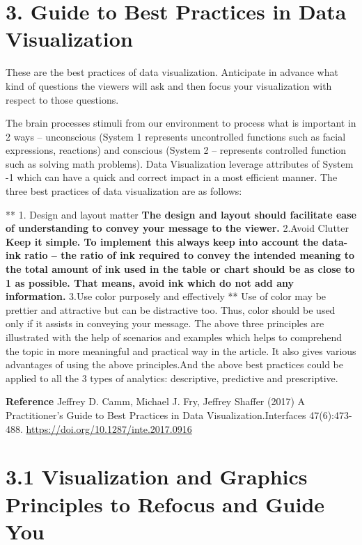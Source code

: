 \documentclass[]{book}
\theoremstyle{definition}
\theoremstyle{definition}
\theoremstyle{definition}
\theoremstyle{remark}
\begin{document}
\section{3. Guide to Best Practices in Data
Visualization}\label{guide-to-best-practices-in-data-visualization}

These are the best practices of data visualization. Anticipate in
advance what kind of questions the viewers will ask and then focus your
visualization with respect to those questions.

The brain processes stimuli from our environment to process what is
important in 2 ways -- unconscious (System 1 represents uncontrolled
functions such as facial expressions, reactions) and conscious (System 2
-- represents controlled function such as solving math problems). Data
Visualization leverage attributes of System -1 which can have a quick
and correct impact in a most efficient manner. The three best practices
of data visualization are as follows:

** 1. Design and layout matter \textbf{ The design and layout should
facilitate ease of understanding to convey your message to the viewer. }
2.Avoid Clutter \textbf{ Keep it simple. To implement this always keep
into account the data-ink ratio -- the ratio of ink required to convey
the intended meaning to the total amount of ink used in the table or
chart should be as close to 1 as possible. That means, avoid ink which
do not add any information. } 3.Use color purposely and effectively **
Use of color may be prettier and attractive but can be distractive too.
Thus, color should be used only if it assists in conveying your message.
The above three principles are illustrated with the help of scenarios
and examples which helps to comprehend the topic in more meaningful and
practical way in the article. It also gives various advantages of using
the above principles.And the above best practices could be applied to
all the 3 types of analytics: descriptive, predictive and prescriptive.

\textbf{Reference} Jeffrey D. Camm, Michael J. Fry, Jeffrey Shaffer
(2017) A Practitioner's Guide to Best Practices in Data
Visualization.Interfaces 47(6):473-488.
\url{https://doi.org/10.1287/inte.2017.0916}

\section{3.1 Visualization and Graphics Principles to Refocus and Guide
You}\label{visualization-and-graphics-principles-to-refocus-and-guide-you}
\end{document}
